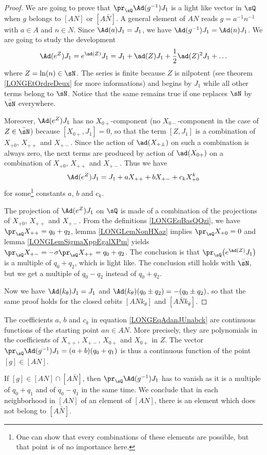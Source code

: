 \begin{proof}
	We are going to prove that $\pr_{\sQ}\Ad(g^{-1})J_1$ is a light like vector in $\sQ$ when $g$ belongs to $[AN]$ or $[A\bar N]$. A general element of $AN$ reads $g=a^{-1}n^{-1}$ with $a\in A$ and $n\in N$. Since $\Ad(a)J_1=J_1$, we have $\Ad(g^{-1})J_1=\Ad(n)J_1$. We are going to study the development
	\begin{equation}
		\Ad( e^{Z})J_1= e^{\ad(Z)}J_1=J_1+\ad(Z)J_1+\frac{ 1 }{2}\ad(Z)^2J_1+\ldots
	\end{equation}
	where $Z=\ln(n)\in\sN$. The series is finite because $Z$ is nilpotent (see theorem \ref{LONGEtOrdreDeux} for more informations) and begins by $J_1$ while all other terms belong to $\sN$. Notice that the same remains true if one replaces $\sN$ by $\bar \sN$ everywhere. 
	
	Moreover, $\Ad( e^{Z})J_1$ has no $X_{0+}$-component (no $X_{0-}$-component in the case of $Z\in\bar\sN$) because $[X_{0+},J_1]=0$, so that the term $[Z,J_1]$ is a combination of $X_{+0}$, $X_{++}$ and $X_{+-}$.  Since the action of $\ad(X_{+\pm})$ on such a combination is always zero, the next terms are produced by action of $\ad(X_{0+})$ on a combination of $X_{+0}$, $X_{++}$ and $X_{+-}$. Thus we have
\begin{equation}		\label{LONGEqAdanJUnabck}
	\Ad( e^{Z})J_1=J_1+aX_{++}+bX_{+-}+c_kX_{+0}^k
\end{equation}
for some\footnote{One can show that every combinations of these elements are possible, but that point is of no importance here.} constants $a$, $b$ and $c_k$.

The projection of $\Ad( e^{Z})J_1$ on $\sQ$ is made of a combination of the projections of $X_{+0}$, $X_{++}$ and $X_{+-}$. From the definitions \eqref{LONGEqBasQQzi}, we have $\pr_{\sQ}X_{++}=q_0+q_2$, lemma \ref{LONGLemNonHXaz} implies $\pr_{\sQ}X_{+0}=0$ and lemma \ref{LONGLemSigmaXppEgalXPm} yields $\pr_{\sQ}X_{+-}=-\sigma\pr_{\sQ}X_{++}=q_0+q_2$. The conclusion is that $\pr_{\sQ}\big( e^{\ad(Z)}J_1\big)$ is a multiple of $q_0+q_2$, which is light like. The conclusion still holds with $\bar\sN$, but we get a multiple of $q_0-q_2$ instead of $q_0+q_2$.

	Now we have $\Ad(k_{\theta})J_1=J_1$ and $\Ad(k_{\theta})(q_0\pm q_2)=-(q_0\pm q_2)$, so that the same proof holds for the closed orbits $[ANk_{\theta}]$ and $[A\bar N k_{\theta}]$.
\end{proof}

\begin{remark}		\label{LONGRemANANbarYapas}
	The coefficients $a$, $b$ and $c_k$ in equation \eqref{LONGEqAdanJUnabck} are continuous functions of the starting point $an\in AN$. More precisely, they are polynomials in the coefficients of $X_{++}$, $X_{+-}$, $X_{0+}$ and $X_{0+}$ in $Z$. The vector $\pr_{\sQ}\Ad(g^{-1})J_1=(a+b)(q_0+q_1)$ is thus a continuous function of the point $[g]\in[AN]$.

	If $[g]\in[AN]\cap[A\bar N]$, then $\pr_{\sQ}\Ad(g^{-1})J_1$ has to vanish as it is a multiple of $q_0+q_1$ and of $q_0-q_1$ in the same time. We conclude that in each neighborhood in $[AN]$ of an element of $[AN]$, there is an element which does not belong to $[A\bar N]$.
\end{remark}

